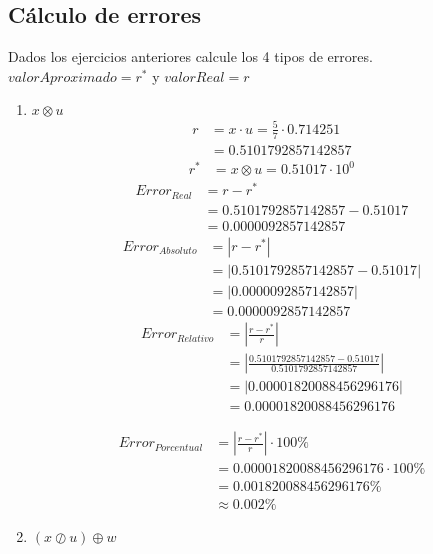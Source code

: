 \documentclass[12pt]{article}
\begin{document}
\subsection*{Cálculo de errores}

Dados los ejercicios anteriores calcule los 4 tipos de errores.
$valor Aproximado = r^{*}$ y $valor Real = r$

\begin{enumerate}
    \item $x \otimes u$
    \[  
    \begin{aligned}
        r &= x \cdot u = \frac{5}{7} \cdot 0.714251\\
          &= 0.5101792857142857 
    \end{aligned}
    \]
    \[  
    \begin{aligned}
        r^{*} &= x \otimes u = 0.51017 \cdot 10^{0}
    \end{aligned}
    \]
    \[
    \begin{aligned}
        Error_{Real} &= r - r^{*}\\
                     &= 0.5101792857142857 - 0.51017\\
                     &= 0.0000092857142857
    \end{aligned}
    \]
    \[
        \begin{aligned}
            Error_{Absoluto} &= |r - r^{*}|\\
                         &= |0.5101792857142857 - 0.51017|\\
                         &= |0.0000092857142857|\\
                         &= 0.0000092857142857
        \end{aligned}
    \]
    \[
        \begin{aligned}
            Error_{Relativo} &= \left| \frac{r - r^{*}}{r}\right|\\
                         &= \left| \frac{0.5101792857142857 - 0.51017}{0.5101792857142857}\right|\\
                         &= |0.00001820088456296176|\\
                         &= 0.00001820088456296176
        \end{aligned}
    \]

    \[
        \begin{aligned}
            Error_{Porcentual} &= \left| \frac{r - r^{*}}{r}\right| \cdot 100\%\\
                         &= 0.00001820088456296176 \cdot 100\%\\
                         &= 0.001820088456296176\%\\
                         &\approx 0.002\%
        \end{aligned}
    \]
    \item $(x \oslash u) \oplus w$
    

\end{enumerate}
\end{document}
